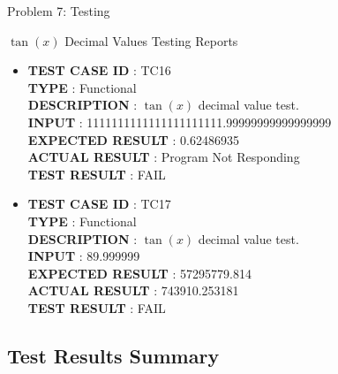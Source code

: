 \documentclass[a4paper,12pt]{article}
\begin{document}
\begin{section}{Problem 7: Testing}
\begin{subsubsection}{$\tan(x)$ Decimal Values Testing Reports}
\begin{itemize}
\item \textbf{TEST CASE ID} \hspace{1.25cm} : TC16  \\
\textbf{TYPE } \hspace{3.15cm}  : Functional\\
\textbf{DESCRIPTION }\hspace{1.25cm} : $\tan(x)$ decimal value test. \\
\textbf{INPUT} \hspace{3.05cm} :  1111111111111111111111.99999999999999999 \\
\textbf{EXPECTED RESULT} \hspace{0.01cm} : 0.62486935  \\
\textbf{ACTUAL RESULT} \hspace{0.6cm} : Program Not Responding \\
\textbf{TEST RESULT} \hspace{1.40cm} : FAIL \\	

\item \textbf{TEST CASE ID} \hspace{1.25cm} : TC17 \\
\textbf{TYPE } \hspace{3.15cm}  : Functional\\
\textbf{DESCRIPTION }\hspace{1.25cm} : $\tan(x)$ decimal value test. \\
\textbf{INPUT} \hspace{3.05cm} :  89.999999 \\
\textbf{EXPECTED RESULT} \hspace{0.01cm} : 57295779.814 \\
\textbf{ACTUAL RESULT} \hspace{0.6cm} : 743910.253181 \\
\textbf{TEST RESULT} \hspace{1.40cm} : FAIL \\

\end{itemize}
\end{subsubsection}



\subsection{Test Results Summary}


\end{section}
\end{document}
